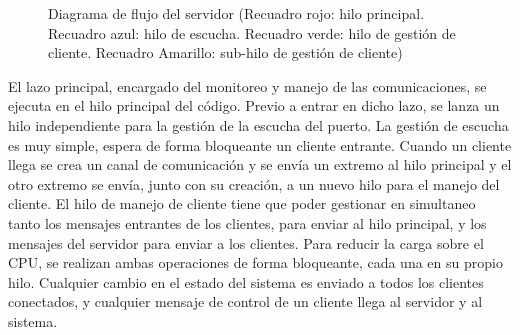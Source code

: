 \documentclass[12pt,letterpaper]{article}     %
\begin{document}
\begin{figure}[!h]
\begin{center}
	\end{center}
\caption{Diagrama de flujo del servidor (Recuadro rojo: hilo principal. 
Recuadro azul: hilo de escucha. 
Recuadro verde: hilo de gestión de cliente. 
Recuadro Amarillo: sub-hilo de gestión de cliente)}
\label{fig:diagramaServer}
\end{figure}

El lazo principal, encargado del monitoreo y manejo de las comunicaciones, se ejecuta en el hilo principal del código. 
Previo a entrar en dicho lazo, se lanza un hilo independiente para la gestión de la escucha del puerto.
La gestión de escucha es muy simple, espera de forma bloqueante un cliente entrante. Cuando un cliente llega
se crea un canal de comunicación y se envía un extremo al hilo principal y el otro extremo se envía, junto con su
creación, a un nuevo hilo para el manejo del cliente.
El hilo de manejo de cliente tiene que poder gestionar en simultaneo tanto los mensajes entrantes de los clientes,
para enviar al hilo principal, y los mensajes del servidor para enviar a los clientes. Para reducir la carga 
sobre el CPU, se realizan ambas operaciones de forma bloqueante, cada una en su propio hilo. 
Cualquier cambio en el estado del sistema es enviado a todos los clientes conectados, y cualquier mensaje de
control de un cliente llega al servidor y al sistema.
\end{document}
